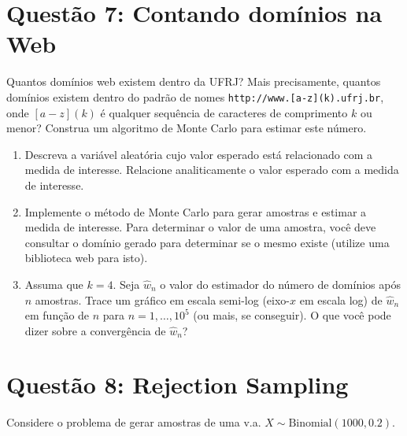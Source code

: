 \documentclass[12 pt]{article}
\begin{document}
\section*{Questão 7: Contando domínios na Web}

Quantos domínios web existem dentro da UFRJ? Mais precisamente, quantos domínios existem dentro do padrão de nomes \texttt{http://www.[a-z](k).ufrj.br}, onde $[a-z](k)$ é qualquer sequência de caracteres de comprimento $k$ ou menor? Construa um algoritmo de Monte Carlo para estimar este número.

\begin{enumerate}
    \item Descreva a variável aleatória cujo valor esperado está relacionado com a medida de interesse. Relacione analiticamente o valor esperado com a medida de interesse.
    \begin{tcolorbox}[colframe=black, title=Resposta:]

    \end{tcolorbox}
    \item Implemente o método de Monte Carlo para gerar amostras e estimar a medida de interesse. Para determinar o valor de uma amostra, você deve consultar o domínio gerado para determinar se o mesmo existe (utilize uma biblioteca web para isto).
    \begin{tcolorbox}[colframe=black, title=Resposta:]

    \end{tcolorbox}
    \item Assuma que $k = 4$. Seja $\hat{w}_n$ o valor do estimador do número de domínios após $n$ amostras. Trace um gráfico em escala semi-log (eixo-$x$ em escala log) de $\hat{w}_n$ em função de $n$ para $n = 1, \dots, 10^5$ (ou mais, se conseguir). O que você pode dizer sobre a convergência de $\hat{w}_n$?
    \begin{tcolorbox}[colframe=black, title=Resposta:]

    \end{tcolorbox}
\end{enumerate}

\section*{Questão 8: Rejection Sampling}

Considere o problema de gerar amostras de uma v.a. $X \sim \text{Binomial}(1000, 0.2)$.
\end{document}
